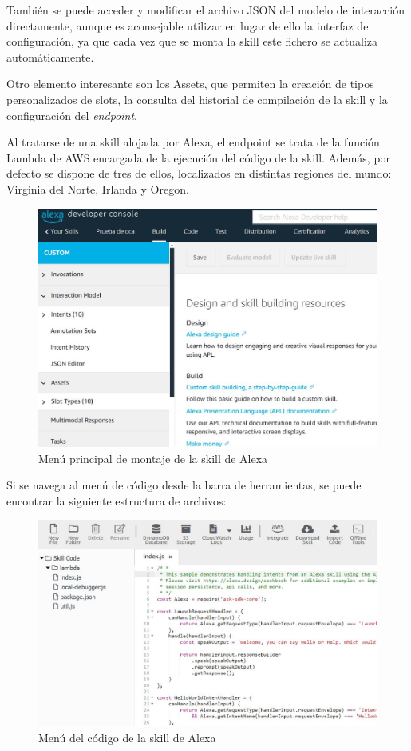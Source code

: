 También se puede acceder y modificar el archivo JSON del modelo de interacción directamente, aunque es aconsejable utilizar en lugar de ello la interfaz de configuración, ya que cada vez que se monta la skill este fichero se actualiza automáticamente.

Otro elemento interesante son los Assets, que permiten la creación de tipos personalizados de slots, la consulta del historial de compilación de la skill y la configuración del \textit{endpoint}. 

Al tratarse de una skill alojada por Alexa, el endpoint se trata de la función Lambda de AWS encargada de la ejecución del código de la skill. Además, por defecto se dispone de tres de ellos, localizados en distintas regiones del mundo: Virginia del Norte, Irlanda y Oregon.

\begin{figure}[H]
	\centering
	\includegraphics[width=1\textwidth]{imgs/alexa-dev-console-1.jpg}
	\caption{Menú principal de montaje de la skill de Alexa}
	\label{fig:alexa-dev-console-1}
\end{figure}

Si se navega al menú de código desde la barra de herramientas, se puede encontrar la siguiente estructura de archivos:

\begin{figure}[H]
	\centering
	\includegraphics[width=1\textwidth]{imgs/alexa-dev-console-3.jpg}
	\caption{Menú del código de la skill de Alexa}
	\label{fig:alexa-dev-console-3}
\end{figure}

